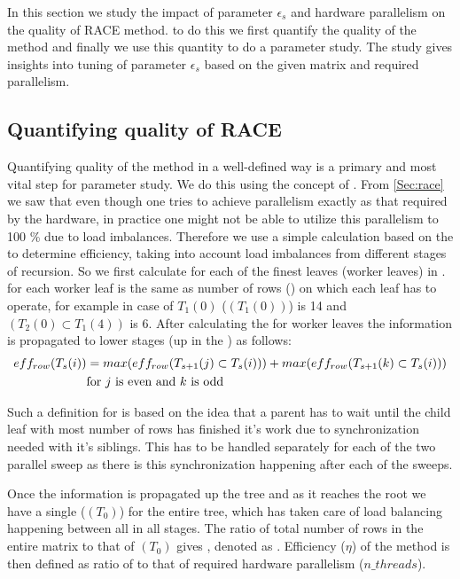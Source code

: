 
In this section we study the impact of parameter $\epsilon_s$ and hardware parallelism on the quality of  RACE method. \Inorder to do this we first quantify the quality of the method and finally we  use this quantity to do a parameter study. The study gives insights into tuning of parameter $\epsilon_s$ based on the given matrix and required parallelism.


\subsection{Quantifying quality of RACE}
Quantifying quality of the method in a well-defined way is a primary and most vital step for parameter study. We do this using the concept of \effPar. From \cref{Sec:race} we saw that even though one tries to achieve parallelism exactly as that required by the hardware, in practice one might not be able to utilize this parallelism to 100 \% due to load imbalances. Therefore we use a simple calculation based on the \levelTree to determine efficiency, taking into account load imbalances from different stages of recursion. So we first calculate \effRow for each of the finest leaves (worker leaves) in \levelTree. \EffRow for each worker leaf is the same as number of rows (\nrows) on which each leaf has to operate, for example in case of $T_1(0)$ \effRow (\nrowsEff$(T_1(0))$) is 14 and \nrowsEff$(T_2(0) \subset T_1(4))$ is 6. After calculating the \effRow for worker leaves the information is propagated to lower stages (up in the \levelTree) as follows: 
\begin{align*}
eff_{row}(T_s(i)) &= max(eff_{row}(T_{s+1}(j) \subset T_s(i))) + max(eff_{row}(T_{s+1}(k) \subset T_s(i)))\\
 & \text{for } j \text{ is even and } k \text{ is odd}
\end{align*}

Such a definition for \effRow is based on the idea that a parent has to wait until the child leaf with most number of rows has finished it's work due to synchronization needed with it's siblings. This has to be handled separately for each of the two parallel sweep as there is this synchronization happening after each of the sweeps. 

Once the information is propagated up the tree and as it reaches the root we have a single \effRow (\nrowsEff$(T_0)$) for the entire tree, which has taken care of load balancing happening between all \levelGroups in all stages. The ratio of total number of rows in the entire matrix to that of \nrowsEff$(T_0)$ gives \effPar, denoted as \threadEff. Efficiency ($\eta$) of the method is then defined as ratio of  \threadEff to that of required hardware parallelism ($n\_threads$). 

